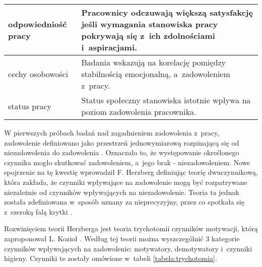 \begin{minipage}{\textwidth}
\begin{table}[H]
\begin{center}
\begin{tabular}{|P{.2\textwidth}|P{.7\textwidth}|}
                         odpowiedniość pracy &
                         Pracownicy odczuwają większą satysfakcję jeśli wymagania stanowiska pracy pokrywają się z~ich zdolnościami i~aspiracjami. \\
                         \hline

                         cechy osobowości &
                         Badania wskazują na korelację pomiędzy stabilnością emocjonalną, a~zadowoleniem z~pracy. \\
                         \hline

                         status pracy &
                         Status społeczny stanowiska istotnie wpływa na poziom zadowolenia pracownika. \\
                         \hline
                     \end{tabular}
                 \end{center}
                 \raggedright{}
                 \vspace{0.75cm}
             \end{table}
\end{minipage}

W pierwszych próbach badań nad zagadnieniem zadowolenia z~pracy, zadowolenie definiowano jako przestrzeń jednowymiarową rozpinającą się od niezadowolenia do zadowolenia \cite{sowinska-2014}.
Oznaczało to, że występowanie określonego czynnika mogło skutkować zadowoleniem, a~jego brak - niezadowoleniem.
Nowe spojrzenie na tę kwestię wprowadził F. Herzberg definiując teorię dwuczynnikową,
która zakłada, że czynniki wpływające na zadowolenie mogą być rozpatrywane niezależnie od czynników wpływających na niezadowolenie.
Teoria ta jednak została zdefiniowana w~sposób uznany za nieprecyzyjny, przez co spotkała się z~szeroką falą krytki \cite{sowinska-2014}.

Rozwinięciem teorii Herzberga jest teoria trychotomii czynników motywacji, którą zaproponował L. Kozioł \cite{koziol-2011}.
Według tej teorii można wyszczególnić 3 kategorie czynników wpływających na zadowolenie: motywatory, demotywatory i~czynniki higieny.
Czynniki te zostały omówione w~tabeli \ref{tabela:trychotomia}.


